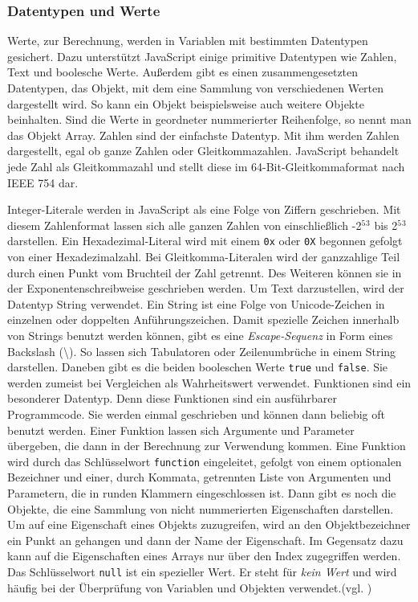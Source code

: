 \subsubsection{Datentypen und Werte} Werte, zur Berechnung, werden in Variablen mit bestimmten Datentypen gesichert. Dazu unterstützt JavaScript einige primitive Datentypen wie Zahlen, Text und boolesche Werte. Außerdem gibt es einen zusammengesetzten Datentypen, das Objekt, mit dem eine Sammlung von verschiedenen Werten dargestellt wird. So kann ein Objekt beispielsweise auch weitere Objekte beinhalten. Sind die Werte in geordneter nummerierter Reihenfolge, so nennt man das Objekt Array. Zahlen sind der einfachste Datentyp. Mit ihm werden Zahlen dargestellt, egal ob ganze Zahlen oder Gleitkommazahlen. JavaScript behandelt jede Zahl als Gleitkommazahl und stellt diese im 64-Bit-Gleitkommaformat nach IEEE 754 dar.\par Integer-Literale werden in JavaScript als eine Folge von Ziffern geschrieben. Mit diesem Zahlenformat lassen sich alle ganzen Zahlen von einschließlich -2$^5$$^3$ bis 2$^5$$^3$ darstellen. Ein Hexadezimal-Literal wird mit einem \texttt{0x} oder \texttt{0X} begonnen gefolgt von einer Hexadezimalzahl. Bei Gleitkomma-Literalen wird der ganzzahlige Teil durch einen Punkt vom Bruchteil der Zahl getrennt. Des Weiteren können sie in der Exponentenschreibweise geschrieben werden. Um Text darzustellen, wird der Datentyp String verwendet. Ein String ist eine Folge von Unicode-Zeichen in einzelnen oder doppelten Anführungszeichen. Damit spezielle Zeichen innerhalb von Strings benutzt werden können, gibt es eine \textit{Escape-Sequenz} in Form eines Backslash (\textbackslash). So lassen sich Tabulatoren oder Zeilenumbrüche in einem String darstellen. Daneben gibt es die beiden booleschen Werte \texttt{true} und \texttt{false}. Sie werden zumeist bei Vergleichen als Wahrheitswert verwendet. Funktionen sind ein besonderer Datentyp. Denn diese Funktionen sind ein ausführbarer Programmcode. Sie werden einmal geschrieben und können dann beliebig oft benutzt werden. Einer Funktion lassen sich Argumente und Parameter übergeben, die dann in der Berechnung zur Verwendung kommen. Eine Funktion wird durch das Schlüsselwort \texttt{function} eingeleitet, gefolgt von einem optionalen Bezeichner und einer, durch Kommata, getrennten Liste von Argumenten und Parametern, die in runden Klammern eingeschlossen ist. Dann gibt es noch die Objekte, die eine Sammlung von nicht nummerierten Eigenschaften darstellen. Um auf eine Eigenschaft eines Objekts zuzugreifen, wird an den Objektbezeichner ein Punkt an gehangen und dann der Name der Eigenschaft. Im Gegensatz dazu kann auf die Eigenschaften eines Arrays nur über den Index zugegriffen werden. Das Schlüsselwort \texttt{null} ist ein spezieller Wert. Er steht für \textit{kein Wert} und wird häufig bei der Überprüfung von Variablen und Objekten verwendet.(vgl. \cite[S.22ff]{FlanJava2007})
	
